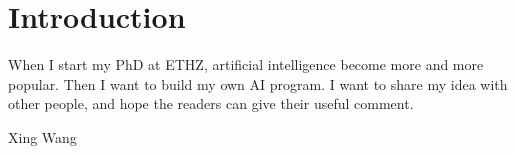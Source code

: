 
\chapter{Introduction}

When I start my PhD at ETHZ, artificial intelligence become more and more popular. Then I want to build my own AI program.
I want to share my idea with other people, and hope the readers can give their useful comment.

Xing Wang

